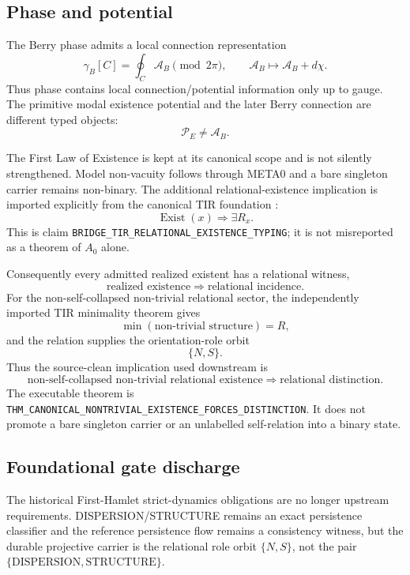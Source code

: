 \documentclass[11pt]{article}
\newcommand{\claimid}[1]{\nolinkurl{#1}}
\begin{document}
\subsection{Phase and potential}

The Berry phase admits a local connection representation
\[
\gamma_B[C]
=
\oint_C\mathcal A_B
\pmod{2\pi},
\qquad
\mathcal A_B\mapsto\mathcal A_B+d\chi.
\]
Thus phase contains local connection/potential information only up to gauge.
The primitive modal existence potential and the later Berry connection are
different typed objects:
\[
\boxed{
\mathcal P_E\neq\mathcal A_B.
}
\]

The First Law of Existence is kept at its canonical scope and is not silently
strengthened. Model non-vacuity follows through META0 and a bare singleton
carrier remains non-binary. The additional relational-existence implication is
imported explicitly from the canonical TIR foundation \cite{LipaTIR2026}:
\[
\boxed{
\operatorname{Exist}(x)
\Longrightarrow
\exists R_x.
}
\]
This is claim
\claimid{BRIDGE_TIR_RELATIONAL_EXISTENCE_TYPING};
it is not misreported as a theorem of \(A_0\) alone.

Consequently every admitted realized existent has a relational witness,
\[
\boxed{
\text{realized existence}
\Longrightarrow
\text{relational incidence}.
}
\]
For the non-self-collapsed non-trivial relational sector, the independently
imported TIR minimality theorem gives
\[
\min(\text{non-trivial structure})=R,
\]
and the relation supplies the orientation-role orbit
\[
\boxed{\{N,S\}.}
\]
Thus the source-clean implication used downstream is
\[
\boxed{
\text{non-self-collapsed non-trivial relational existence}
\Longrightarrow
\text{relational distinction}.
}
\]
The executable theorem is
\claimid{THM_CANONICAL_NONTRIVIAL_EXISTENCE_FORCES_DISTINCTION}. It does not
promote a bare singleton carrier or an unlabelled self-relation into a binary
state.

\subsection{Foundational gate discharge}

The historical First-Hamlet strict-dynamics obligations are no longer upstream
requirements. DISPERSION/STRUCTURE remains an exact persistence classifier and
the reference persistence flow remains a consistency witness, but the durable
projective carrier is the relational role orbit \(\{N,S\}\), not the pair
\(\{\mathrm{DISPERSION},\mathrm{STRUCTURE}\}\).
\end{document}
